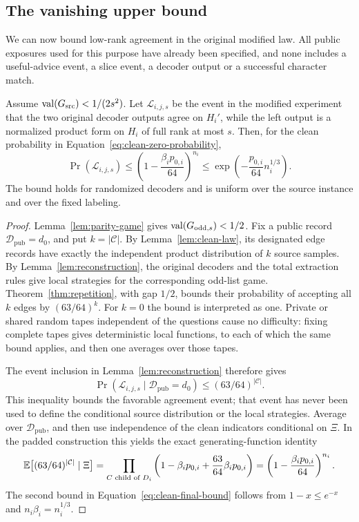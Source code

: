 \subsection{The vanishing upper bound}

We can now bound low-rank agreement in the original modified law.
All public exposures used for this purpose have already been
specified, and none includes a useful-advice event, a slice event,
a decoder output or a successful character match.

\begin{proposition}
\label{prop:clean-bound}
Assume
$\operatorname{val}(G_{\mathrm{src}})<1/(2s^2)$.  Let
$\mathcal L_{i,j,s}$ be the event in the modified experiment that the
two original decoder outputs agree on $H_i'$, while the left output
is a normalized product form on $H_i$ of full rank at most $s$.
Then, for the clean probability in
Equation~\eqref{eq:clean-zero-probability},
\begin{equation}
 \Pr(\mathcal L_{i,j,s})
 \le \left(1-\frac{\beta_i p_{0,i}}{64}\right)^{n_i}
 \le \exp\!\left(-\frac{p_{0,i}}{64}n_i^{1/3}\right).
 \label{eq:clean-final-bound}
\end{equation}
The bound holds for randomized decoders and is uniform over the
source instance and over the fixed labeling.
\end{proposition}

\begin{proof}
Lemma~\ref{lem:parity-game} gives
$\operatorname{val}(G_{\mathrm{odd},s})<1/2$.  Fix a public record
$\mathcal D_{\mathrm{pub}}=d_0$, and put $k=|\mathcal C|$.  By
Lemma~\ref{lem:clean-law}, its designated edge records have exactly
the independent product distribution of $k$ source samples.  By
Lemma~\ref{lem:reconstruction}, the original decoders and the total
extraction rules give local strategies for the corresponding odd-list
game.  Theorem~\ref{thm:repetition}, with gap $1/2$, bounds their
probability of accepting all $k$ edges by $(63/64)^k$.
For $k=0$ the bound is interpreted as one.  Private or shared random
tapes independent of the questions cause no difficulty: fixing
complete tapes gives deterministic local functions, to each of which
the same bound applies, and then one averages over those tapes.

The event inclusion in Lemma~\ref{lem:reconstruction} therefore gives
\[
 \Pr(\mathcal L_{i,j,s}\mid\mathcal D_{\mathrm{pub}}=d_0)
 \le (63/64)^{|\mathcal C|}.
\]
This inequality bounds the favorable agreement event; that event
has never been used to define the conditional source distribution
or the local strategies.  Average over $\mathcal D_{\mathrm{pub}}$, and then use
independence of the clean indicators conditional on $\Xi$.  In the
padded construction this yields the exact generating-function identity
\[
 \mathbb E\bigl[(63/64)^{|\mathcal C|}\mid\Xi\bigr]
 =\prod_{C\text{ child of }D_i}
       \left(1-\beta_i p_{0,i}
                   +\frac{63}{64}\beta_i p_{0,i}\right)
 =\left(1-\frac{\beta_i p_{0,i}}{64}\right)^{n_i}.
\]
The second bound in Equation~\eqref{eq:clean-final-bound} follows from
$1-x\le e^{-x}$ and $n_i\beta_i=n_i^{1/3}$.
\end{proof}

